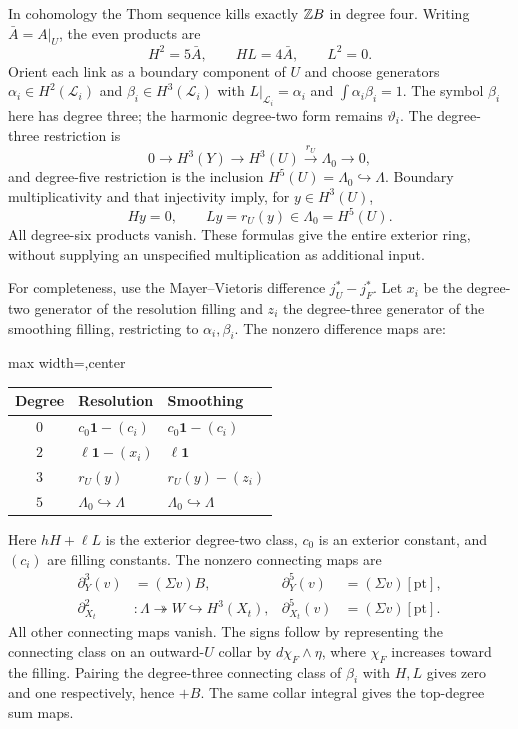 In cohomology the Thom sequence kills exactly $\mathbb Z B$ in degree four.
Writing $\bar A=A|_U$, the even products are
\[
 H^2=5\bar A,\qquad HL=4\bar A,\qquad L^2=0.
\]
Orient each link as a boundary component of $U$ and choose generators
$\alpha_i\in H^2(\mathcal L_i)$ and $\beta_i\in H^3(\mathcal L_i)$
with $L|_{\mathcal L_i}=\alpha_i$ and $\int\alpha_i\beta_i=1$.
The symbol $\beta_i$ here has degree three; the harmonic degree-two
form remains $\vartheta_i$. The degree-three restriction is
\begin{equation}\label{eq:exterior-cohomology}
 0\to H^3(Y)\to H^3(U)\xrightarrow{r_U}\Lambda_0\to0,
\end{equation}
and degree-five restriction is the inclusion $H^5(U)=\Lambda_0\hookrightarrow\Lambda$.
Boundary multiplicativity and that injectivity imply, for $y\in H^3(U)$,
\[
 Hy=0,\qquad Ly=r_U(y)\in \Lambda_0=H^5(U).
\]
All degree-six products vanish. These formulas give the entire exterior
ring, without supplying an unspecified multiplication as additional input.

For completeness, use the Mayer--Vietoris difference $j_U^*-j_F^*$.
Let $x_i$ be the degree-two generator of the resolution filling and $z_i$
the degree-three generator of the smoothing filling, restricting to
$\alpha_i,\beta_i$. The nonzero difference maps are:
\begin{center}
\begin{adjustbox}{max width=\textwidth,center}
\begin{tabular}{cll}
\toprule
Degree & Resolution & Smoothing\\
\midrule
$0$ & $c_0\mathbf1-(c_i)$ & $c_0\mathbf1-(c_i)$\\
$2$ & $\ell\mathbf1-(x_i)$ & $\ell\mathbf1$\\
$3$ & $r_U(y)$ & $r_U(y)-(z_i)$\\
$5$ & $\Lambda_0\hookrightarrow\Lambda$ & $\Lambda_0\hookrightarrow\Lambda$\\
\bottomrule
\end{tabular}
\end{adjustbox}
\end{center}
Here $hH+\ell L$ is the exterior degree-two class, $c_0$ is an exterior
constant, and $(c_i)$ are filling constants.
The nonzero connecting maps are
\begin{equation}\label{eq:connecting-maps}
 \begin{aligned}
 \partial_Y^3(v)&=(\Sigma v)B,&
 \partial_Y^5(v)&=(\Sigma v)[\mathrm{pt}],\\
 \partial_{X_t}^2&:\Lambda\twoheadrightarrow W\hookrightarrow H^3(X_t),&
 \partial_{X_t}^5(v)&=(\Sigma v)[\mathrm{pt}].
 \end{aligned}
\end{equation}
All other connecting maps vanish. The signs follow by representing the
connecting class on an outward-$U$ collar by $d\chi_F\wedge\eta$,
where $\chi_F$ increases toward the filling. Pairing the degree-three
connecting class of $\beta_i$ with $H,L$ gives zero and one respectively,
hence $+B$. The same collar integral gives the top-degree sum maps.

